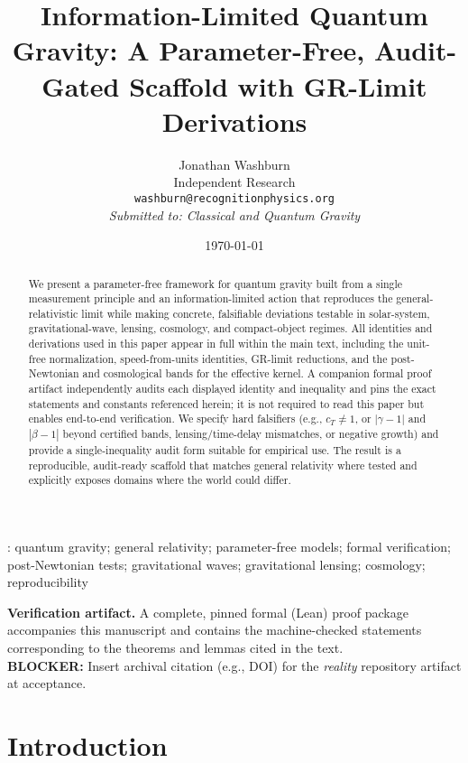 \documentclass[12pt,a4paper]{article}
\title{Information-Limited Quantum Gravity: A Parameter-Free, Audit-Gated Scaffold with GR-Limit Derivations}
\author{Jonathan Washburn\\
\small Independent Research\\
\small \texttt{washburn@recognitionphysics.org}\\[1ex]
\small \textit{Submitted to: Classical and Quantum Gravity}}
\date{\today}
\begin{document}
\maketitle

\begin{abstract}
We present a parameter-free framework for quantum gravity built from a single measurement principle and an information-limited action that reproduces the general-relativistic limit while making concrete, falsifiable deviations testable in solar-system, gravitational-wave, lensing, cosmology, and compact-object regimes. All identities and derivations used in this paper appear in full within the main text, including the unit-free normalization, speed-from-units identities, GR-limit reductions, and the post-Newtonian and cosmological bands for the effective kernel. A companion formal proof artifact independently audits each displayed identity and inequality and pins the exact statements and constants referenced herein; it is not required to read this paper but enables end-to-end verification. We specify hard falsifiers (e.g., $c_T\neq 1$, or $|\gamma-1|$ and $|\beta-1|$ beyond certified bands, lensing/time-delay mismatches, or negative growth) and provide a single-inequality audit form suitable for empirical use. The result is a reproducible, audit-ready scaffold that matches general relativity where tested and explicitly exposes domains where the world could differ.
\end{abstract}

\vspace{1ex}
: quantum gravity; general relativity; parameter-free models; formal verification; post-Newtonian tests; gravitational waves; gravitational lensing; cosmology; reproducibility

\vspace{2ex}
\noindent\textbf{Verification artifact.} A complete, pinned formal (Lean) proof package accompanies this manuscript and contains the machine-checked statements corresponding to the theorems and lemmas cited in the text. \\
\textbf{BLOCKER:} Insert archival citation (e.g., DOI) for the \emph{reality} repository artifact at acceptance.


\section{Introduction}
\end{document}
